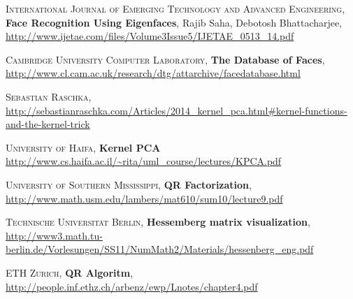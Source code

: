 \documentclass[12pt, twocolumn]{article}
\begin{document}
	
	\newpage
	\begin{thebibliography}{9}
	
		\textsc{International Journal of Emerging Technology and Advanced Engineering}, \textbf{Face 
		Recognition Using Eigenfaces}, Rajib Saha, Debotosh Bhattacharjee,
		\url{http://www.ijetae.com/files/Volume3Issue5/IJETAE_0513_14.pdf}
		
		\textsc{Cambridge University Computer Laboratory}, \textbf{The Database of Faces},
		\url{http://www.cl.cam.ac.uk/research/dtg/attarchive/facedatabase.html}
	
		\textsc{Sebastian Raschka},
		\url{http://sebastianraschka.com/Articles/2014_kernel_pca.html#kernel-functions-and-the-kernel-trick}
		
		\textsc{University of Haifa}, \textbf{Kernel PCA}
		\url{http://www.cs.haifa.ac.il/~rita/uml_course/lectures/KPCA.pdf}
	
		\textsc{University of Southern Mississippi}, \textbf{QR Factorization},
		\url{http://www.math.usm.edu/lambers/mat610/sum10/lecture9.pdf}
		
		\textsc{Technische Universität Berlin}, \textbf{Hessemberg matrix visualization},
		\url{http://www3.math.tu-berlin.de/Vorlesungen/SS11/NumMath2/Materials/hessenberg_eng.pdf}
		
		\textsc{ETH Zurich}, \textbf{QR Algoritm},
		\url{http://people.inf.ethz.ch/arbenz/ewp/Lnotes/chapter4.pdf}
	
	\end{thebibliography}
	
\end{document}
